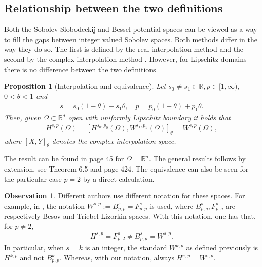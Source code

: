 \documentclass[
    a4paper,
    DIV=14,
    abstract=true,
    numbers=noenddot
]
{scrartcl}
\newtheorem{proposition}[theorem]{Proposition}
\theoremstyle{definition}
\newtheorem{observation}{Observation}
\newcommand{\R}{\mathbb{R}}
\begin{document}
\subsection{Relationship between the two definitions}
Both the Sobolev-Slobodeckij and Bessel potential spaces can be viewed as a way to fill the gaps between integer valued Sobolev spaces. Both methods differ in the way they do so. The first is defined by the real interpolation method and the second by the complex interpolation method . However, for Lipschitz domains there is no difference between the two definitions
\begin{proposition}[Interpolation and equivalence]\label{equivalence fractional spaces theorem}
	Let $s_0 \neq s_1 \in \R, p \in [1, \infty)$, $0<\theta<1$ and
	\begin{align*}
		s=s_0(1-\theta)+s_1 \theta, \quad p=p_0(1-\theta)+p_1 \theta.
	\end{align*}
	Then, given $\Omega \subset \R^d$ open with uniformly Lipschitz boundary it holds that
	\begin{align*}
		H^{s,p}(\Omega )=\left[H^{s_0,p_0}(\Omega), W^{s_1,p_1}(\Omega)\right]_{\theta}=W^{s,p}(\Omega),
	\end{align*}
	where $[X,Y]_\theta$ denotes the complex interpolation space.
\end{proposition}
The result can be found in \cite{triebel1992theory} page 45 for $\Omega = \R^n$. The general results follows by extension, see \cite{taira2004semigroups} Theorem 6.5 and \cite{leoni2017first} page 424. The equivalence can also be seen for the particular case $p=2$ by a direct calculation.
\begin{observation}
	Different authors use different notation for these spaces. For example, in \cite{triebel1992theory}, the notation $W^{s,p}:= B^{s}_{p,p}=F^s_{p,p}$ is used, where $B^s_{p,q}, F^s_{p,q}$ are respectively Besov and Triebel-Lizorkin spaces. With this notation, one has that, for $p \neq 2$,
	\begin{align*}
		H^{s,p}= F^s_{p,2} \neq B^{s}_{p,p}= W^{s,p}.
	\end{align*}
	In particular, when $s=k$ is an integer, the standard $W^{k,p}$ as defined  \href{https://nowheredifferentiable.com/2023-07-12-PDEs-3-Sobolev_spaces/#:~:text=Hint-,Definition,-10%20(Sobolev%20spaces}{previously} is $H^{k,p}$  and not $B^k_{p,p}$. Whereas, with our notation, always $H^{s,p}=W^{s,p}$.
\end{observation}
\end{document}
